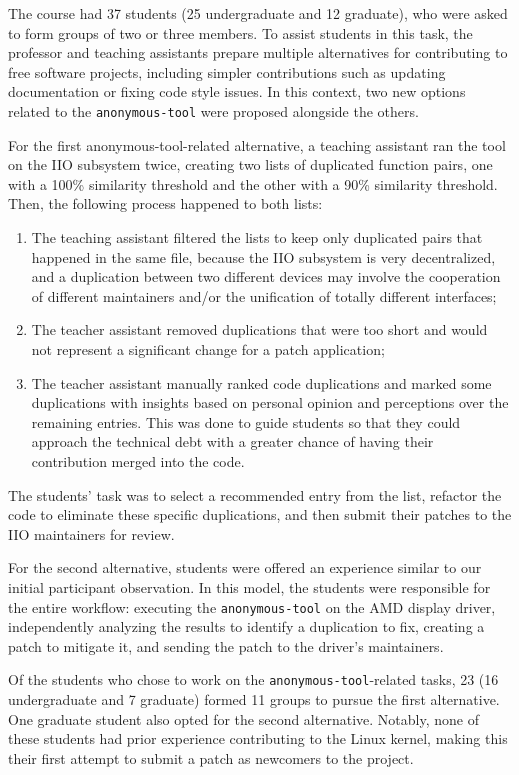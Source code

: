 \documentclass[12pt]{article}
\begin{document}
The course had 37 students (25 undergraduate and 12 graduate), who were asked to form groups of 
two or three members. To assist students in this task, the professor and teaching assistants prepare multiple 
alternatives for contributing to free software projects, including simpler contributions such as 
updating documentation or fixing code style issues. In this context, two new options related to the 
\texttt{anonymous-tool} were proposed alongside the others.

For the first anonymous-tool-related alternative, a teaching assistant ran the tool on the IIO subsystem twice, creating two lists of duplicated function pairs, one with a 100\% similarity threshold and the other with a 90\% similarity threshold. Then, the following process happened to both lists:

\begin{enumerate}
    \item The teaching assistant filtered the lists to keep only duplicated pairs that happened in the same file, because the IIO subsystem is very decentralized, and a duplication between two different devices may involve the cooperation of different maintainers and/or the unification of totally different interfaces;
    \item The teacher assistant removed duplications that were too short and would not represent a significant change for a patch application;
    \item The teacher assistant manually ranked code duplications and marked some duplications with insights based on personal opinion and perceptions over the remaining entries. This was done to guide students so that they could approach the technical debt with a greater chance of having their contribution merged into the code.
\end{enumerate}

The students' task was to select a recommended entry from the list, refactor the code to eliminate these specific duplications, and then submit their patches to the IIO maintainers for review.

For the second alternative, students were offered an experience similar to our initial participant 
observation. In this model, the students were responsible for the entire workflow: executing the 
\texttt{anonymous-tool} on the AMD display driver, independently analyzing the results to identify a duplication 
to fix, creating a patch to mitigate it, and sending the patch to the driver's maintainers.

Of the students who chose to work on the \texttt{anonymous-tool}-related tasks, 23 (16 undergraduate and 7 graduate) 
formed 11 groups to pursue the first alternative. One graduate student also opted for the second alternative. Notably, none of these students had prior experience contributing to the Linux kernel, making this their first attempt to submit a patch as newcomers to the project.
\end{document}
